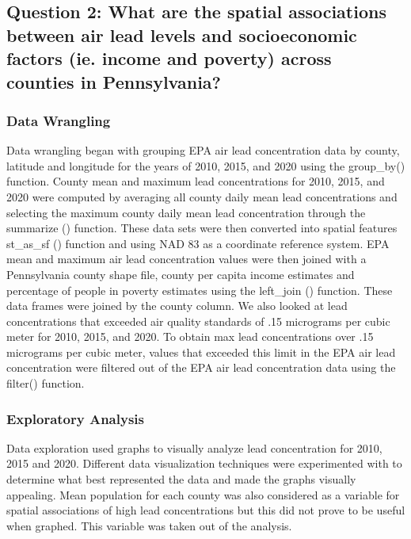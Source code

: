 \documentclass[
  12pt,
]{article}
\begin{document}
\hypertarget{question-2-what-are-the-spatial-associations-between-air-lead-levels-and-socioeconomic-factors-ie.-income-and-poverty-across-counties-in-pennsylvania}{%
\subsection{Question 2: What are the spatial associations between air
lead levels and socioeconomic factors (ie. income and poverty) across
counties in
Pennsylvania?}\label{question-2-what-are-the-spatial-associations-between-air-lead-levels-and-socioeconomic-factors-ie.-income-and-poverty-across-counties-in-pennsylvania}}

\hypertarget{data-wrangling}{%
\subsubsection{Data Wrangling}\label{data-wrangling}}

Data wrangling began with grouping EPA air lead concentration data by
county, latitude and longitude for the years of 2010, 2015, and 2020
using the group\_by() function. County mean and maximum lead
concentrations for 2010, 2015, and 2020 were computed by averaging all
county daily mean lead concentrations and selecting the maximum county
daily mean lead concentration through the summarize () function. These
data sets were then converted into spatial features st\_as\_sf ()
function and using NAD 83 as a coordinate reference system. EPA mean and
maximum air lead concentration values were then joined with a
Pennsylvania county shape file, county per capita income estimates and
percentage of people in poverty estimates using the left\_join ()
function. These data frames were joined by the county column. We also
looked at lead concentrations that exceeded air quality standards of .15
micrograms per cubic meter for 2010, 2015, and 2020. To obtain max lead
concentrations over .15 micrograms per cubic meter, values that exceeded
this limit in the EPA air lead concentration were filtered out of the
EPA air lead concentration data using the filter() function.

\hypertarget{exploratory-analysis-1}{%
\subsubsection{Exploratory Analysis}\label{exploratory-analysis-1}}

Data exploration used graphs to visually analyze lead concentration for
2010, 2015 and 2020. Different data visualization techniques were
experimented with to determine what best represented the data and made
the graphs visually appealing. Mean population for each county was also
considered as a variable for spatial associations of high lead
concentrations but this did not prove to be useful when graphed. This
variable was taken out of the analysis.
\end{document}
